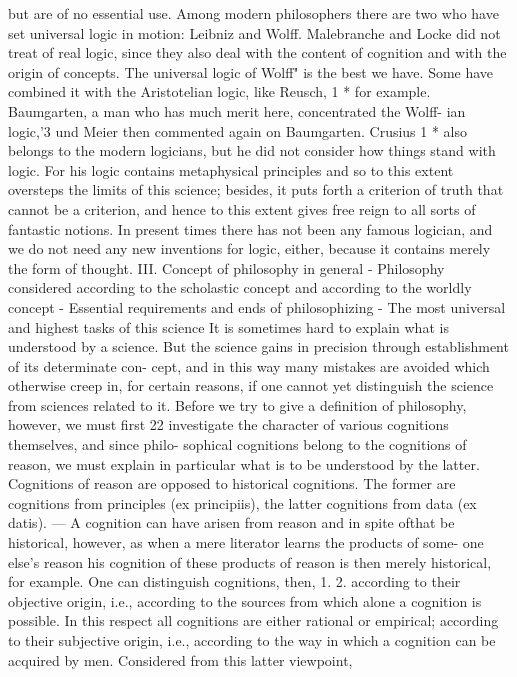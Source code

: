 but are of no essential use.
Among modern philosophers there are two who have set universal logic
in motion: Leibniz and Wolff.
Malebranche and Locke did not treat of real logic, since they also deal
with the content of cognition and with the origin of concepts.
The universal logic of Wolff" is the best we have. Some have combined
it with the Aristotelian logic, like Reusch, 1 * for example.
Baumgarten, a man who has much merit here, concentrated the Wolff-
ian logic,'3 und Meier then commented again on Baumgarten.
Crusius 1 * also belongs to the modern logicians, but he did not consider
how things stand with logic. For his logic contains metaphysical principles
and so to this extent oversteps the limits of this science; besides, it puts
forth a criterion of truth that cannot be a criterion, and hence to this
extent gives free reign to all sorts of fantastic notions.
In present times there has not been any famous logician, and we do not
need any new inventions for logic, either, because it contains merely the
form of thought.
III.
Concept of philosophy in general - Philosophy considered according to
the scholastic concept and according to the worldly concept - Essential
requirements and ends of philosophizing - The most universal and
highest tasks of this science
It is sometimes hard to explain what is understood by a science. But the
science gains in precision through establishment of its determinate con-
cept, and in this way many mistakes are avoided which otherwise creep in,
for certain reasons, if one cannot yet distinguish the science from sciences
related to it.
Before we try to give a definition of philosophy, however, we must first 22
investigate the character of various cognitions themselves, and since philo-
sophical cognitions belong to the cognitions of reason, we must explain in
particular what is to be understood by the latter.
Cognitions of reason are opposed to historical cognitions. The former
are cognitions from principles (ex principiis), the latter cognitions from data
(ex datis). — A cognition can have arisen from reason and in spite ofthat be
historical, however, as when a mere literator learns the products of some-
one else's reason his cognition of these products of reason is then merely
historical, for example.
One can distinguish cognitions, then,
1.
2.
according to their objective origin, i.e., according to the sources from which
alone a cognition is possible. In this respect all cognitions are either rational or
empirical;
according to their subjective origin, i.e., according to the way in which a
cognition can be acquired by men. Considered from this latter viewpoint,
